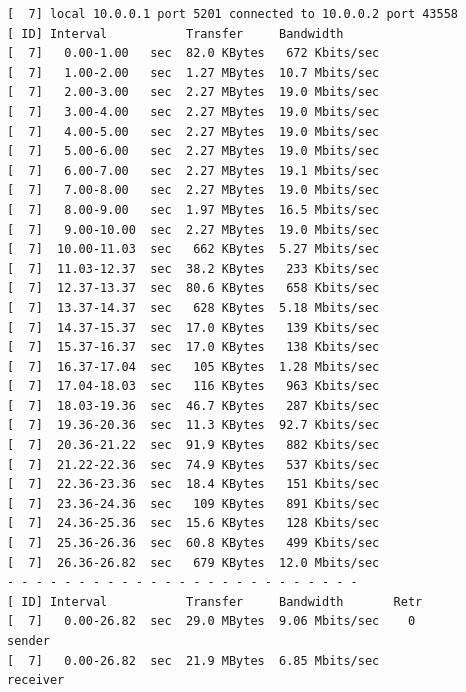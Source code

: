 \documentclass[12pt]{article}
\begin{document}
\begin{enumerate}
	\begin{latin}
		\begin{Verbatim}
[  7] local 10.0.0.1 port 5201 connected to 10.0.0.2 port 43558
[ ID] Interval           Transfer     Bandwidth
[  7]   0.00-1.00   sec  82.0 KBytes   672 Kbits/sec                  
[  7]   1.00-2.00   sec  1.27 MBytes  10.7 Mbits/sec                  
[  7]   2.00-3.00   sec  2.27 MBytes  19.0 Mbits/sec                  
[  7]   3.00-4.00   sec  2.27 MBytes  19.0 Mbits/sec                  
[  7]   4.00-5.00   sec  2.27 MBytes  19.0 Mbits/sec                  
[  7]   5.00-6.00   sec  2.27 MBytes  19.0 Mbits/sec                  
[  7]   6.00-7.00   sec  2.27 MBytes  19.1 Mbits/sec                  
[  7]   7.00-8.00   sec  2.27 MBytes  19.0 Mbits/sec                  
[  7]   8.00-9.00   sec  1.97 MBytes  16.5 Mbits/sec                  
[  7]   9.00-10.00  sec  2.27 MBytes  19.0 Mbits/sec                  
[  7]  10.00-11.03  sec   662 KBytes  5.27 Mbits/sec                  
[  7]  11.03-12.37  sec  38.2 KBytes   233 Kbits/sec                  
[  7]  12.37-13.37  sec  80.6 KBytes   658 Kbits/sec                  
[  7]  13.37-14.37  sec   628 KBytes  5.18 Mbits/sec                  
[  7]  14.37-15.37  sec  17.0 KBytes   139 Kbits/sec                  
[  7]  15.37-16.37  sec  17.0 KBytes   138 Kbits/sec                  
[  7]  16.37-17.04  sec   105 KBytes  1.28 Mbits/sec                  
[  7]  17.04-18.03  sec   116 KBytes   963 Kbits/sec                  
[  7]  18.03-19.36  sec  46.7 KBytes   287 Kbits/sec                  
[  7]  19.36-20.36  sec  11.3 KBytes  92.7 Kbits/sec                  
[  7]  20.36-21.22  sec  91.9 KBytes   882 Kbits/sec                  
[  7]  21.22-22.36  sec  74.9 KBytes   537 Kbits/sec                  
[  7]  22.36-23.36  sec  18.4 KBytes   151 Kbits/sec                  
[  7]  23.36-24.36  sec   109 KBytes   891 Kbits/sec                  
[  7]  24.36-25.36  sec  15.6 KBytes   128 Kbits/sec                  
[  7]  25.36-26.36  sec  60.8 KBytes   499 Kbits/sec                  
[  7]  26.36-26.82  sec   679 KBytes  12.0 Mbits/sec                  
- - - - - - - - - - - - - - - - - - - - - - - - -
[ ID] Interval           Transfer     Bandwidth       Retr
[  7]   0.00-26.82  sec  29.0 MBytes  9.06 Mbits/sec    0             sender
[  7]   0.00-26.82  sec  21.9 MBytes  6.85 Mbits/sec                  receiver

		\end{Verbatim}
	\end{latin}
	

\end{enumerate}
\end{document}
